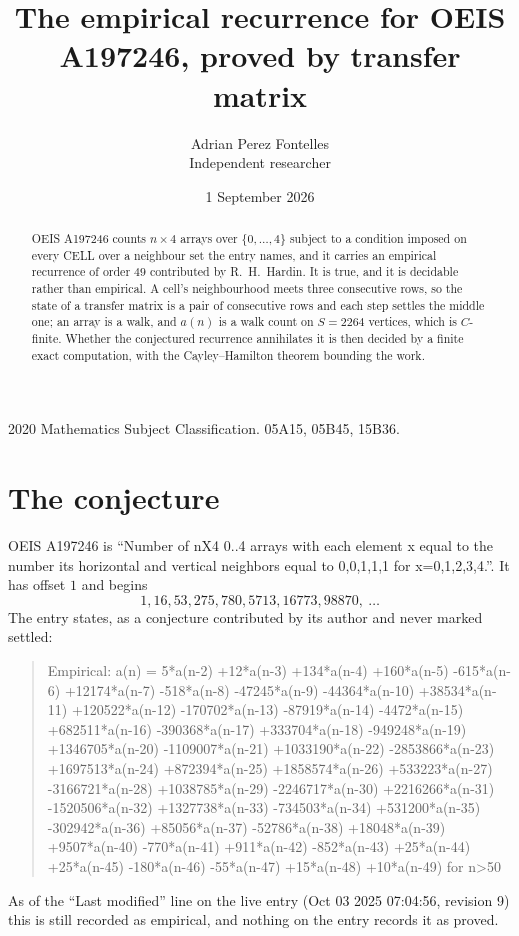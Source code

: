 \documentclass[11pt,a4paper]{article}
\title{The empirical recurrence for OEIS A197246, proved by transfer matrix}
\author{Adrian Perez Fontelles\\ \small Independent researcher}
\date{1 September 2026}
\theoremstyle{plain}
\theoremstyle{definition}
\begin{document}
\maketitle

\begin{abstract}
OEIS A197246 counts $n\times4$ arrays over $\{0,\dots,4\}$ subject to a condition imposed on
every CELL over a neighbour set the entry names, and it carries an empirical recurrence of
order $49$ contributed by R.~H.~Hardin. It is true, and it is decidable rather than
empirical. A cell's neighbourhood meets three consecutive rows, so the state of a transfer
matrix is a pair of consecutive rows and each step settles the middle one; an array is a
walk, and $a(n)$ is a walk count on $S=2264$ vertices, which is $C$-finite. Whether the
conjectured recurrence annihilates it is then decided by a finite exact computation, with the
Cayley--Hamilton theorem bounding the work.
\end{abstract}

\noindent\small 2020 Mathematics Subject Classification. 05A15, 05B45, 15B36.\normalsize

\section{The conjecture}

OEIS A197246 is ``Number of nX4 0..4 arrays with each element x equal to the number its horizontal and vertical neighbors equal to 0,0,1,1,1 for x=0,1,2,3,4.''. It has offset $1$ and begins
\[
1, 16, 53, 275, 780, 5713, 16773, 98870,\ \dots
\]
The entry states, as a conjecture contributed by its author and never marked settled:
\begin{quote}
Empirical: a(n) = 5*a(n-2) +12*a(n-3) +134*a(n-4) +160*a(n-5) -615*a(n-6) +12174*a(n-7) -518*a(n-8) -47245*a(n-9) -44364*a(n-10) +38534*a(n-11) +120522*a(n-12) -170702*a(n-13) -87919*a(n-14) -4472*a(n-15) +682511*a(n-16) -390368*a(n-17) +333704*a(n-18) -949248*a(n-19) +1346705*a(n-20) -1109007*a(n-21) +1033190*a(n-22) -2853866*a(n-23) +1697513*a(n-24) +872394*a(n-25) +1858574*a(n-26) +533223*a(n-27) -3166721*a(n-28) +1038785*a(n-29) -2246717*a(n-30) +2216266*a(n-31) -1520506*a(n-32) +1327738*a(n-33) -734503*a(n-34) +531200*a(n-35) -302942*a(n-36) +85056*a(n-37) -52786*a(n-38) +18048*a(n-39) +9507*a(n-40) -770*a(n-41) +911*a(n-42) -852*a(n-43) +25*a(n-44) +25*a(n-45) -180*a(n-46) -55*a(n-47) +15*a(n-48) +10*a(n-49) for n>50
\end{quote}
As of the ``Last modified'' line on the live entry (Oct 03 2025 07:04:56, revision 9) this is still
recorded as empirical, and nothing on the entry records it as proved.
\end{document}
